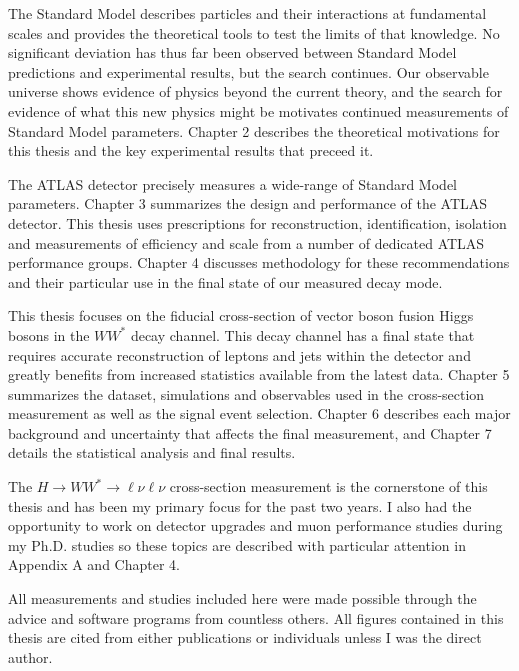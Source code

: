 The Standard Model describes particles and their interactions at fundamental scales and provides the theoretical tools to test the limits of that knowledge. No significant deviation has thus far been observed between Standard Model predictions and experimental results, but the search continues. Our observable universe shows evidence of physics beyond the current theory, and the search for evidence of what this new physics might be motivates continued measurements of Standard Model parameters. Chapter 2 describes the theoretical motivations for this thesis and the key experimental results that preceed it. 
 
The ATLAS detector precisely measures a wide-range of Standard Model parameters. Chapter 3 summarizes the design and performance of the ATLAS detector. This thesis uses prescriptions for reconstruction, identification, isolation and measurements of efficiency and scale from a number of dedicated ATLAS performance groups. Chapter 4 discusses methodology for these recommendations and their particular use in the final state of our measured decay mode. 

 This thesis focuses on the fiducial cross-section of vector boson fusion Higgs bosons in the $WW^*$ decay channel. This decay channel has a final state that requires accurate reconstruction of leptons and jets within the detector and greatly benefits from increased statistics available from the latest data. Chapter 5 summarizes the dataset, simulations and observables used in the cross-section measurement as well as the signal event selection. Chapter 6 describes each major background and uncertainty that affects the final measurement, and Chapter 7 details the statistical analysis and final results.  

The $H\rightarrow WW^*\rightarrow \ell\nu\ell\nu$ cross-section measurement is the cornerstone of this thesis and has been my primary focus for the past two years. I also had the opportunity to work on detector upgrades and muon performance studies during my Ph.D. studies so these topics are described with particular attention in Appendix A and Chapter 4. 

All measurements and studies included here were made possible through the advice and software programs from countless others. All figures contained in this thesis are cited from either publications or individuals unless I was the direct author.

